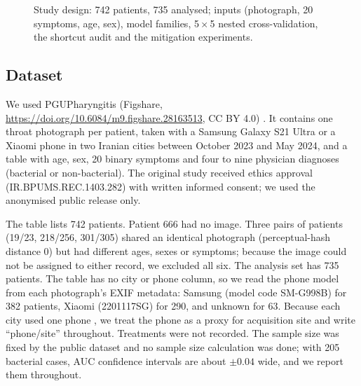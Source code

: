 \documentclass[preprint,12pt]{elsarticle}
\begin{document}
\begin{figure}[!htbp]
{{}}
\caption{Study design: 742 patients, 735 analysed; inputs (photograph, 20 symptoms, age, sex), model families, 5\,$\times$\,5 nested cross-validation, the shortcut audit and the mitigation experiments.}
\label{fig:design}
\end{figure}

\subsection{Dataset}

We used PGUPharyngitis (Figshare, \url{https://doi.org/10.6084/m9.figshare.28163513}, CC BY 4.0) \cite{shojaei2025pgu}. It contains one throat photograph per patient, taken with a Samsung Galaxy S21 Ultra or a Xiaomi phone in two Iranian cities between October 2023 and May 2024, and a table with age, sex, 20 binary symptoms and four to nine physician diagnoses (bacterial or non-bacterial). The original study received ethics approval (IR.BPUMS.REC.1403.282) with written informed consent; we used the anonymised public release only.

The table lists 742 patients. Patient 666 had no image. Three pairs of patients (19/23, 218/256, 301/305) shared an identical photograph (perceptual-hash distance 0) but had different ages, sexes or symptoms; because the image could not be assigned to either record, we excluded all six. The analysis set has 735 patients. The table has no city or phone column, so we read the phone model from each photograph's EXIF metadata: Samsung (model code SM-G998B) for 382 patients, Xiaomi (2201117SG) for 290, and unknown for 63. Because each city used one phone \cite{shojaei2025pgu}, we treat the phone as a proxy for acquisition site and write ``phone/site'' throughout. Treatments were not recorded. The sample size was fixed by the public dataset and no sample size calculation was done; with 205 bacterial cases, AUC confidence intervals are about $\pm 0.04$ wide, and we report them throughout.
\end{document}

